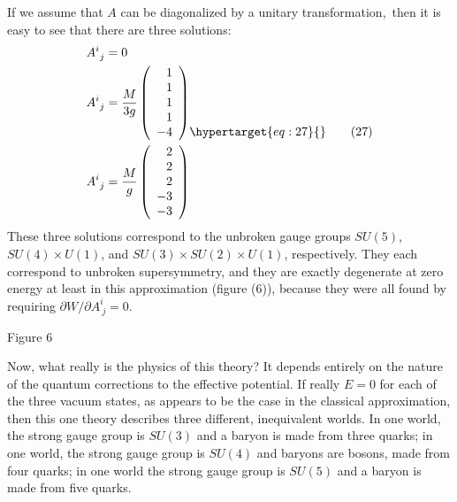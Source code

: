 \documentclass[11pt,a4paper]{article}
\newcommand{\eqtarget}[1]{\hypertarget{eq:#1}{\mathstrut}\tag{#1}}
\begin{document}
If we assume that $A$ can be diagonalized by a unitary transformation,\begingroup\renewcommand{\thefootnote}{\fnsymbol{footnote}}\footnotemark[1]\endgroup\ then it is easy to see that there are three solutions:
\begin{equation}
\begin{aligned}
A^i_{\ j} &= 0 \\
A^i_{\ j} &= \frac{M}{3g}
\left(
\begin{array}{r}
1 \\
1 \\
1 \\
1 \\
-4
\end{array}
\right) \\
A^i_{\ j} &= \frac{M}{g}
\left(
\begin{array}{r}
2 \\
2 \\
2 \\
-3 \\
-3
\end{array}
\right)
\end{aligned}
\eqtarget{27}
\end{equation}
These three solutions correspond to the unbroken gauge groups $SU(5)$,
$SU(4) \times U(1)$, and $SU(3) \times SU(2) \times U(1)$, respectively. They each
correspond to unbroken supersymmetry, and they are exactly degenerate
at zero energy at least in this approximation (figure (6)), because
they were all found by requiring $\partial W/\partial A^i_{\ j} = 0$.

\begingroup
\renewcommand{\thefootnote}{\fnsymbol{footnote}}
\endgroup

\begin{center}

\par\smallskip
Figure 6
\end{center}

Now, what really is the physics of this theory? It depends
entirely on the nature of the quantum corrections to the effective
potential. If really $E = 0$ for each of the three vacuum states, as
appears to be the case in the classical approximation, then this one
theory describes three different, inequivalent worlds. In one world,
the strong gauge group is $SU(3)$ and a baryon is made from three
quarks; in one world, the strong gauge group is $SU(4)$ and baryons are
bosons, made from four quarks; in one world the strong gauge group is
$SU(5)$ and a baryon is made from five quarks.
\end{document}
